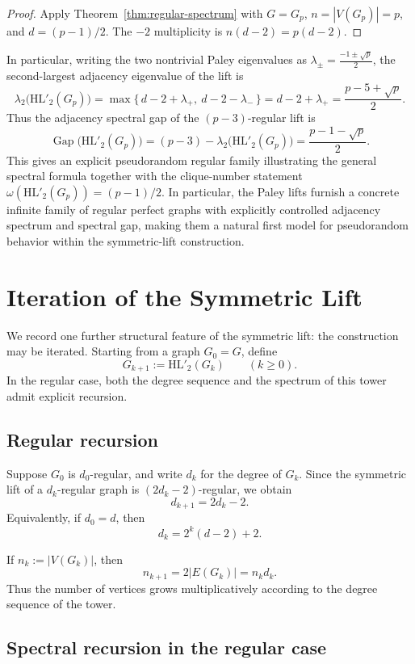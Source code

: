 \documentclass[11pt]{article}
\newcommand{\HL}{\mathrm{HL}}
\theoremstyle{plain}
\DeclareMathOperator{\Gap}{Gap}
\begin{document}
\begin{proof}
Apply Theorem~\ref{thm:regular-spectrum} with \(G=G_p\), \(n=|V(G_p)|=p\), and \(d=(p-1)/2\).
The \(-2\) multiplicity is \(n(d-2)=p(d-2)\).
\end{proof}

In particular, writing the two nontrivial Paley eigenvalues as
\(\lambda_{\pm}=\frac{-1\pm \sqrt p}{2}\), the second-largest adjacency eigenvalue of the lift is
\[
\lambda_2\!\big(\HL'_2(G_p)\big)
=
\max\big\{\, d-2+\lambda_{+},\ d-2-\lambda_{-}\,\big\}
=
d-2+\lambda_{+}
=
\frac{p-5+\sqrt p}{2}.
\]
Thus the adjacency spectral gap of the \((p-3)\)-regular lift is
\[
\Gap\!\big(\HL'_2(G_p)\big)
=
(p-3)-\lambda_2\!\big(\HL'_2(G_p)\big)
=
\frac{p-1-\sqrt p}{2}.
\]
This gives an explicit pseudorandom regular family illustrating the general spectral formula together with the
clique-number statement \(\omega(\HL'_2(G_p))=(p-1)/2\). In particular, the Paley lifts furnish a concrete
infinite family of regular perfect graphs with explicitly controlled adjacency spectrum and spectral gap, making
them a natural first model for pseudorandom behavior within the symmetric-lift construction.

\section{Iteration of the Symmetric Lift}

We record one further structural feature of the symmetric lift: the construction may be iterated.
Starting from a graph \(G_0=G\), define
\[
G_{k+1}:=\HL'_2(G_k)\qquad (k\ge 0).
\]
In the regular case, both the degree sequence and the spectrum of this tower admit explicit recursion.

\subsection{Regular recursion}

Suppose \(G_0\) is \(d_0\)-regular, and write \(d_k\) for the degree of \(G_k\).
Since the symmetric lift of a \(d_k\)-regular graph is \((2d_k-2)\)-regular, we obtain
\[
d_{k+1}=2d_k-2.
\]
Equivalently, if \(d_0=d\), then
\[
d_k = 2^k(d-2)+2.
\]

If \(n_k:=|V(G_k)|\), then
\[
n_{k+1}=2|E(G_k)| = n_k d_k.
\]
Thus the number of vertices grows multiplicatively according to the degree sequence of the tower.

\subsection{Spectral recursion in the regular case}
\end{document}
